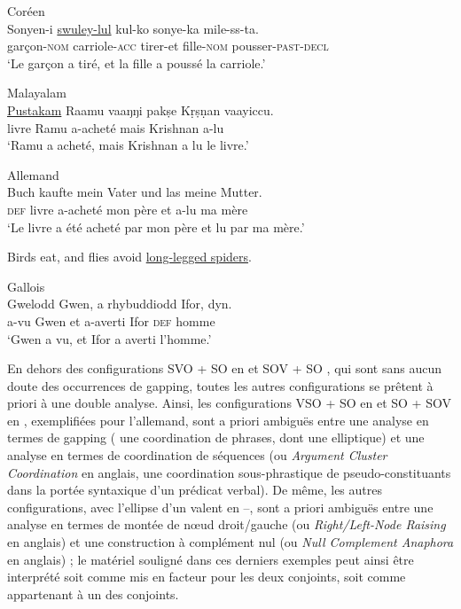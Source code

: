 \ea \label{ch1:ex101}
Coréen\\
\gll Sonyen-i  \uline{swuley-lul}  kul-ko  sonye-ka  mile-ss-ta. \\
garçon-\textsc{nom}  carriole-\textsc{acc}  tirer-et  fille-\textsc{nom}  pousser-\textsc{past-decl}\\
\glt ‘Le garçon a tiré, et la fille a poussé la carriole.’ 
\z

  
\ea \label{ch1:ex102}
Malayalam\\
\gll \uline{Pustakam}  Raamu  vaaŋŋi  pakṣe  Kṛṣṇan  vaayiccu.  \\
livre  Ramu  a-acheté  mais  Krishnan  a-lu\\
\glt ‘Ramu a acheté, mais Krishnan a lu le livre.’ 
\z


\ea \label{ch1:ex103}
Allemand\\
\gll {} Buch kaufte  mein  Vater  und  las  meine  Mutter.  \\
\textsc{def}  livre  a-acheté  mon  père  et  a-lu  ma  mère\\
\glt ‘Le livre a été acheté par mon père et lu par ma mère.’ 
\z


\ea \label{ch1:ex104}
Birds eat, and flies avoid \uline{long-legged spiders}.    
\z

\ea \label{ch1:ex105}
Gallois\\
\gll Gwelodd  Gwen,  a  rhybuddiodd  Ifor,   dyn. \\
a-vu  Gwen  et  a-averti  Ifor \textsc{def} homme\\
\glt ‘Gwen a vu, et Ifor a averti l’homme.’ 
\z 

En dehors des configurations SVO + SO en  et SOV + SO , qui sont sans aucun doute des occurrences de gapping, toutes les autres configurations se prêtent à priori à une double analyse. Ainsi, les configurations VSO + SO en  et SO + SOV en , exemplifiées pour l’allemand, sont a priori ambiguës entre une analyse en termes de gapping ({\cad} une coordination de phrases, dont une elliptique) et une analyse en termes de coordination de séquences (ou \textit{Argument Cluster Coordination} en anglais, {\cad} une coordination sous-phrastique de pseu\-do-constituants dans la portée syntaxique d’un prédicat verbal). De même, les autres configurations, avec l’ellipse d’un valent en --, sont a priori ambiguës entre une analyse en termes de montée de nœud droit/gauche (ou \textit{Right/Left-Node Raising} en anglais) et une construction à complément nul (ou \textit{Null Complement Anaphora} en anglais) ; le matériel souligné dans ces derniers exemples peut ainsi être interprété soit comme mis en facteur pour les deux conjoints, soit comme appartenant à un des conjoints.

